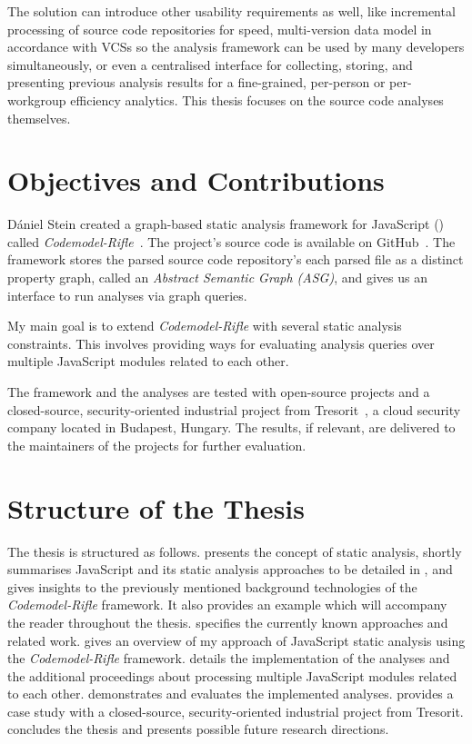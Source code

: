 The solution can introduce other usability requirements as well, like incremental processing of source code repositories for speed, multi-version data model in accordance with VCSs so the analysis framework can be used by many developers simultaneously, or even a centralised interface for collecting, storing, and presenting previous analysis results for a fine-grained, per-person or per-workgroup efficiency analytics. This thesis focuses on the source code analyses themselves.


\section{Objectives and Contributions}

Dániel Stein created a graph-based static analysis framework for JavaScript (\es) called \emph{Codemodel-Rifle}~\cite{stein-daniel-msc}. The project's source code is available on GitHub~\cite{codemodel-rifle-github}. The framework stores the parsed source code repository's each parsed file as a distinct property graph, called an \emph{Abstract Semantic Graph (ASG)}, and gives us an interface to run analyses via graph queries.

My main goal is to extend \emph{Codemodel-Rifle} with several static analysis constraints. This involves providing ways for evaluating analysis queries over multiple JavaScript modules related to each other.

The framework and the analyses are tested with open-source projects and a closed-source, security-oriented industrial project from Tresorit~\cite{tresorit}, a cloud security company located in Budapest, Hungary. The results, if relevant, are delivered to the maintainers of the projects for further evaluation.


\section{Structure of the Thesis}

The thesis is structured as follows. \emph{} presents the concept of static analysis, shortly summarises JavaScript and its static analysis approaches to be detailed in , and gives insights to the previously mentioned background technologies of the \emph{Codemodel-Rifle} framework. It also provides an example which will accompany the reader throughout the thesis. \emph{} specifies the currently known approaches and related work. \emph{} gives an overview of my approach of JavaScript static analysis using the \emph{Codemodel-Rifle} framework. \emph{} details the implementation of the analyses and the additional proceedings about processing multiple JavaScript modules related to each other. \emph{} demonstrates and evaluates the implemented analyses. \emph{} provides a case study with a closed-source, security-oriented industrial project from Tresorit. \emph{} concludes the thesis and presents possible future research directions.

